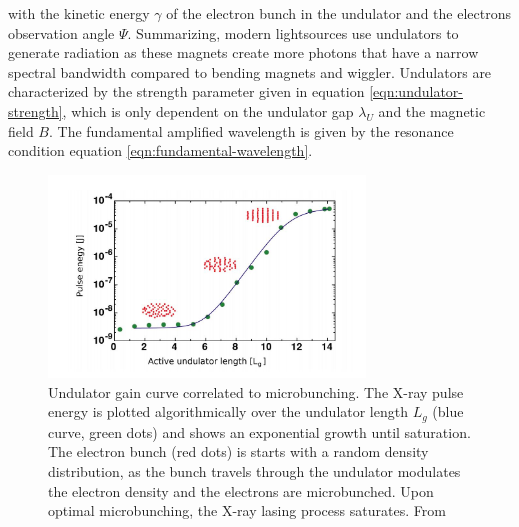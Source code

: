 with the kinetic energy $\gamma$ of the electron bunch in the undulator and the electrons observation angle $\Psi$. Summarizing, modern lightsources use undulators to generate radiation as these magnets create more photons that have a narrow spectral bandwidth compared to bending magnets and wiggler. Undulators are characterized by the strength parameter given in equation \ref{eqn:undulator-strength}, which is only dependent on the undulator gap $\lambda_{U}$ and the magnetic field $B$. The fundamental amplified wavelength is given by the resonance condition equation \ref{eqn:fundamental-wavelength}.\\
\begin{figure}
	\centering
		\includegraphics[width=0.75\textwidth]{images/gain-length.JPG}
	\caption[Undulator gain curve correlated to microbunching.]{Undulator gain curve correlated to microbunching. The X-ray pulse energy is plotted algorithmically over the undulator length $L_{g}$ (blue curve, green dots) and shows an exponential growth until saturation. The electron bunch (red dots) is starts with a random density distribution, as the bunch travels through the undulator modulates the electron density and the electrons are microbunched. Upon optimal microbunching, the X-ray lasing process saturates. From \citep{Rupp-2013-Thesis,Rupp-2016-Springer}}
	\label{fig:gain-length}
\end{figure}
